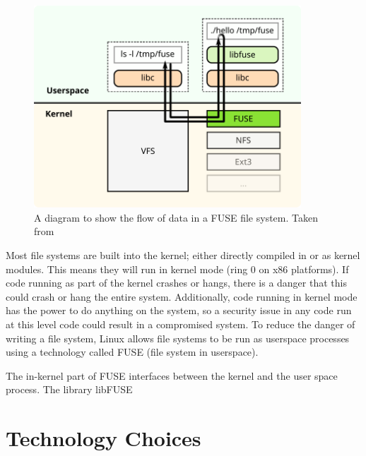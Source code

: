 \begin{figure}[h]
    \centering
    \includegraphics[width=10cm]{../data/fuse.pdf}
    \caption[FUSE Structure]{A diagram to show the flow of data in a FUSE file
        system. Taken from \cite{fuse-diagram-source}}
    \label{fig:fuse diagram}
\end{figure}

Most file systems are built into the kernel; either directly compiled in or as
kernel modules. This means they will run in kernel mode (ring 0 on x86
platforms). If code running as part of the kernel crashes or hangs, there is a
danger that this could crash or hang the entire system. Additionally, code
running in kernel mode has the power to do anything on the system, so a
security issue in any code run at this level code could result in a compromised
system. To reduce the danger of writing a file system, Linux allows file
systems to be run as userspace processes using a technology called
FUSE\cite{kernel-fuse} (file system in userspace).


The in-kernel part of FUSE interfaces between the kernel and the user space
process. The library libFUSE 

\section{Technology Choices}
